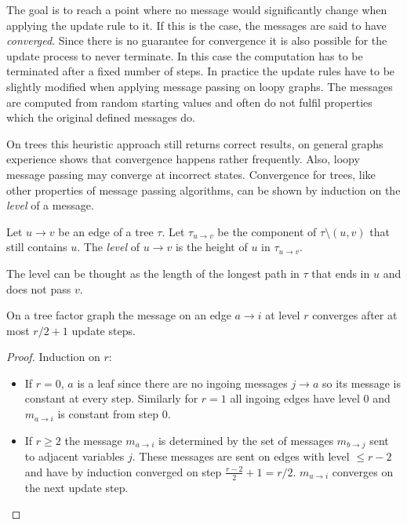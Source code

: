 The goal is to reach a point where no message would significantly change when applying the update rule to it. If this is the case, the messages are said to have \emph{converged}. Since there is no guarantee for convergence it is also possible for the update process to never terminate. In this case the computation has to be terminated after a fixed number of steps. \newline
In practice the update rules have to be slightly modified when applying message passing on loopy graphs. The messages are computed from random starting values and often do not fulfil properties which the original defined messages do. 

On trees this heuristic approach still returns correct results, on general graphs experience shows that convergence happens rather frequently. Also, loopy message passing may converge at incorrect states. \newline
Convergence for trees, like other properties of message passing algorithms, can be shown by induction on the \textit{level} of a message.

\begin{definition} Let $u \rightarrow v$ be an edge of a tree $\tau$. \newline
Let $\tau_{u \rightarrow v}$ be the component of $\tau \setminus (u, v)$ that still contains $u$. The \emph{level} of $u \rightarrow v$ is the height of $u$ in $\tau_{u \rightarrow v}$. 
\end{definition}
The level can be thought as the length of the longest path in $\tau$ that ends in $u$ and does not pass $v$.
\begin{lemma}\cite{survprob}
On a tree factor graph the message on an edge $a \rightarrow i$ at level $r$ converges after at most $r/2 + 1$ update steps.
\begin{proof} Induction on $r$:
\begin{itemize}
\item[] If $r = 0$, $a$ is a leaf since there are no ingoing messages $j \rightarrow a$ so its message is constant at every step. \newline
Similarly for $r = 1$ all ingoing edges have level $0$ and $m_{a \rightarrow i}$ is constant from step $0$.
\item[] If $r \geq 2$ the message $m_{a \rightarrow i}$ is determined by the set of messages $m_{b \rightarrow j}$ sent to adjacent variables $j$. These messages are sent on edges with level $\leq r-2$ and have by induction converged on step $\frac{r-2}{2} + 1 = r / 2$. $m_{a \rightarrow i}$ converges on the next update step.
\end{itemize}
\end{proof}
\end{lemma}

